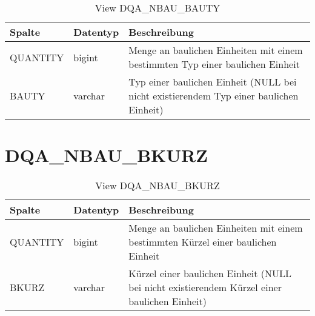   \begin{table}[ht]
    \centering
    \caption{View DQA\_NBAU\_BAUTY}
    \label{tab:dqanbaubauty}
    \begin{tabular}{||l|l|p{10cm}||}
      \hline
      Spalte & Datentyp & Beschreibung \\ [0.5ex] \hline \hline
QUANTITY & bigint & Menge an baulichen Einheiten mit einem bestimmten Typ einer baulichen Einheit \\ \hline
BAUTY & varchar & Typ einer baulichen Einheit (NULL bei nicht existierendem Typ einer baulichen Einheit)\\ \hline
    \end{tabular}
  \end{table}
 
  \section{DQA\_NBAU\_BKURZ}

  \begin{table}[ht]
    \centering
    \caption{View DQA\_NBAU\_BKURZ}
    \label{tab:dqanbaubkurz}
    \begin{tabular}{||l|l|p{10cm}||}
      \hline
      Spalte & Datentyp & Beschreibung \\ [0.5ex] \hline \hline
QUANTITY & bigint & Menge an baulichen Einheiten mit einem bestimmten Kürzel einer baulichen Einheit \\ \hline
BKURZ & varchar & Kürzel einer baulichen Einheit (NULL bei nicht existierendem Kürzel einer baulichen Einheit)\\ \hline
    \end{tabular}
  \end{table}
 \clearpage
